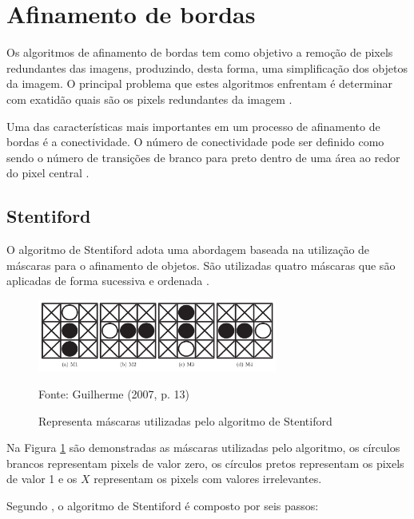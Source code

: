 \documentclass[
	12pt,				%
	oneside,			%
	a4paper,			%
	english,			%
	french,				%
	spanish,			%
	brazil,				%
	]{abntex2}
\begin{document}
\section{Afinamento de bordas}    

Os algoritmos de afinamento de bordas tem como objetivo a remoção de pixels redundantes das imagens, produzindo, desta forma, uma simplificação dos objetos da imagem. O principal problema que estes algoritmos enfrentam é determinar com exatidão quais são os pixels redundantes da imagem \cite{guilherme:2007}.

Uma das características mais importantes em um processo de afinamento de bordas é a conectividade. O número de conectividade pode ser definido como sendo o número de transições de branco para preto dentro de uma área ao redor do pixel central \cite{guilherme:2007}.
    
\subsection{Stentiford}    

O algoritmo de Stentiford adota uma abordagem baseada na utilização de máscaras para o afinamento de objetos. São utilizadas quatro máscaras que são aplicadas de forma sucessiva e ordenada \cite{guilherme:2007}.

\begin{figure}[ht]
\centering
\caption{Representa máscaras utilizadas pelo algoritmo de Stentiford}
\includegraphics[width=0.7\textwidth]{imagens/stentiford.png}

Fonte: Guilherme (2007, p. 13)
\label{fig:stentiford}
\end{figure}

Na Figura \ref{fig:stentiford} são demonstradas as máscaras utilizadas pelo algoritmo, os círculos brancos representam pixels de valor zero, os círculos pretos representam os pixels de valor 1 e os \(X\) representam os pixels com valores irrelevantes.

Segundo \citet{guilherme:2007}, o algoritmo de Stentiford é composto por seis passos:
\end{document}
